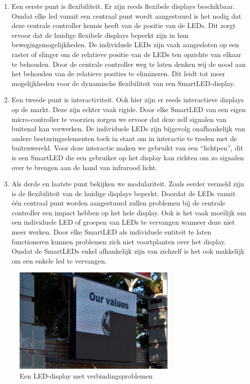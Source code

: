 \documentclass{article}
\begin{document}
\begin{enumerate}


\item Een eerste punt is flexibiliteit. Er zijn reeds flexibele displays beschikbaar. Omdat elke led vanuit een centraal punt wordt aangestuurd is het nodig dat deze centrale controller kennis heeft van de positie van de LEDs. Dit zorgt ervoor dat de huidige flexibele displays beperkt zijn in hun bewegingsmogelijkheden. De individuele LEDs zijn vaak aangesloten op een raster of slinger om de relatieve positie van de LEDs ten opzichte van elkaar te behouden. Door de centrale controller weg te laten denken wij de nood aan het behouden van de relatieve posities te elimineren. Dit leidt tot meer mogelijkheden voor de dynamische flexibiliteit van een SmartLED-display.

\item Een tweede punt is interactiviteit. Ook hier zijn er reeds interactieve displays op de markt. Deze zijn echter vaak rigide. Door elke SmartLED van een eigen micro-controller te voorzien zorgen we ervoor dat deze zelf signalen van buitenaf kan verwerken. De individuele LEDs zijn bijgevolg onafhankelijk van andere besturingselementen toch in staat om in interactie te treden met de buitenwereld. Voor deze interactie maken we gebruikt van een “lichtpen”, dit is een SmartLED die een gebruiker op het display kan richten om zo signalen over te brengen aan de hand van infrarood licht.

\item Als derde en laatste punt bekijken we modulariteit. Zoals eerder vermeld zijn is de flexibiliteit van de huidige displays beperkt. Doordat de LEDs vanuit één centraal punt worden aangestuurd zullen problemen bij de centrale controller een impact hebben op het hele display. Ook is het vaak moeilijk om een individuele LED of groepen van LEDs te vervangen wanneer deze niet meer werken. Door elke SmartLED als individuele entiteit te laten functioneren kunnen problemen zich niet voortplanten over het display. Omdat de SmartLEDs enkel afhankelijk zijn van zichzelf is het ook makkelijk om een enkele led te vervangen.
\end{enumerate}

\begin{figure}
\centering
\includegraphics[width=8cm]{broken.png}
\caption{Een LED-display met verbindingsproblemen}
\end{figure}
\end{document}

